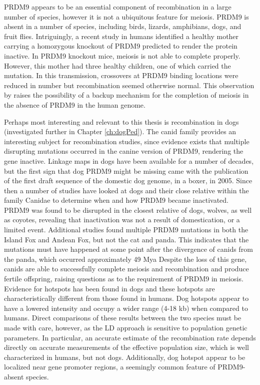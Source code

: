 PRDM9 appears to be an essential component of recombination in a large number of species, however it is not a ubiquitous feature for meiosis.
PRDM9 is absent in a number of species, including birds, lizards, amphibians, dogs, and fruit flies\cite{Ponting2011,Oliver2009}.
Intriguingly, a recent study in humans identified a healthy mother carrying a homozygous knockout of PRDM9 predicted to render the protein inactive\cite{Narasimhan2016}.
In PRDM9 knockout mice, meiosis is not able to complete properly\cite{Brick2012}.
However, this mother had three healthy children, one of which carried the mutation.
In this transmission, crossovers at PRDM9 binding locations were reduced in number but recombination seemed otherwise normal.
This observation by \citet{Narasimhan2016} raises the possibility of a backup mechanism for the completion of meiosis in the absence of PRDM9 in the human genome.


Perhaps most interesting and relevant to this thesis is recombination in dogs (investigated further in Chapter \ref{ch:dogPed}). %
The canid family provides an interesting subject for recombination studies, since evidence exists that multiple disrupting mutations occurred in the canine version of PRDM9, rendering the gene inactive.
Linkage maps in dogs have been available for a number of decades\cite{Mellersh1997,Neff1999}, but
the first sign that dog PRDM9 might be missing came with the publication of the first draft sequence of the domestic dog genome, in a boxer, in 2005\cite{Lindblad-Toh2005}.
Since then a number of studies have looked at dogs and their close relative within the family Canidae to determine when and how PRDM9 became inactivated.
PRDM9 was found to be disrupted in the closest relative of dogs, wolves, as well as coyotes\cite{Munoz-Fuentes2011}, revealing that inactivation was not a result of domestication, or a limited event.
Additional studies found multiple PRDM9 mutations in both the Island Fox and Andean Fox\cite{Auton2013}, but not the cat and panda\cite{Axelsson2012}.
This indicates that the mutations must have happened at some point after the divergence of canids from the panda, which occurred approximately 49 Mya\cite{Oliver2009,Axelsson2012}
Despite the loss of this gene, canids are able to successfully complete meiosis and recombination and produce fertile offspring, raising questions as to the requirement of PRDM9 in meiosis.
Evidence for hotspots has been found in dogs and these hotspots are characteristically different from those found in humans.
Dog hotspots appear to have a lowered intensity and occupy a wider range (4-18 kb)\cite{Axelsson2012,Auton2013} when compared to humans.
Direct comparisons of these results between the two species must be made with care, however, as the LD approach is sensitive to population genetic parameters.
In particular, an accurate estimate of the recombination rate depends directly on accurate measurements of the effective population size, which is well characterized in humans, but not dogs.
Additionally, dog hotspot appear to be localized near gene promoter regions\cite{Auton2013}, a seemingly common feature of PRDM9-absent species.


